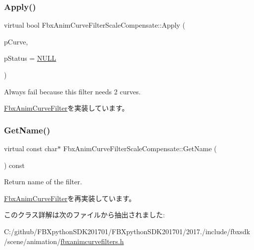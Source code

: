 \subsubsection{\texorpdfstring{Apply()}{Apply()}\hspace{0.1cm}{\footnotesize\ttfamily [6/6]}}
{\footnotesize\ttfamily virtual bool Fbx\+Anim\+Curve\+Filter\+Scale\+Compensate\+::\+Apply (\begin{DoxyParamCaption}\item[{\hyperlink{class_fbx_anim_curve}{Fbx\+Anim\+Curve} \&}]{p\+Curve,  }\item[{\hyperlink{class_fbx_status}{Fbx\+Status} $\ast$}]{p\+Status = {\ttfamily \hyperlink{fbxarch_8h_a070d2ce7b6bb7e5c05602aa8c308d0c4}{N\+U\+LL}} }\end{DoxyParamCaption})\hspace{0.3cm}{\ttfamily [virtual]}}

Always fail because this filter needs 2 curves. 

\hyperlink{class_fbx_anim_curve_filter_a6a69996c47c0e6f63a0f8b0d5fa806a0}{Fbx\+Anim\+Curve\+Filter}を実装しています。

\mbox{\label{class_fbx_anim_curve_filter_scale_compensate_af6564ed47826563b148a2c41901e4f03}} 
\subsubsection{\texorpdfstring{Get\+Name()}{GetName()}}
{\footnotesize\ttfamily virtual const char$\ast$ Fbx\+Anim\+Curve\+Filter\+Scale\+Compensate\+::\+Get\+Name (\begin{DoxyParamCaption}{ }\end{DoxyParamCaption}) const\hspace{0.3cm}{\ttfamily [virtual]}}



Return name of the filter. 



\hyperlink{class_fbx_anim_curve_filter_abd559d5052fbb072042e59241940a35c}{Fbx\+Anim\+Curve\+Filter}を再実装しています。



このクラス詳解は次のファイルから抽出されました\+:\begin{DoxyCompactItemize}
\item 
C\+:/github/\+F\+B\+Xpython\+S\+D\+K201701/\+F\+B\+Xpython\+S\+D\+K201701/2017./include/fbxsdk/scene/animation/\hyperlink{fbxanimcurvefilters_8h}{fbxanimcurvefilters.\+h}\end{DoxyCompactItemize}

